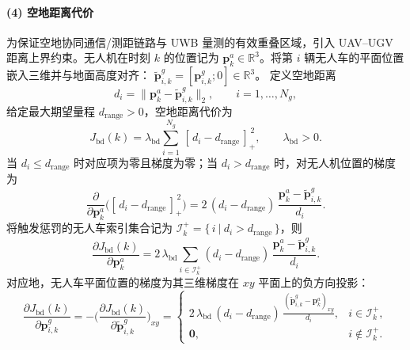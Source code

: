 \paragraph{(4) 空地距离代价}
为保证空地协同通信/测距链路与 UWB 量测的有效重叠区域，引入 UAV--UGV 距离上界约束。无人机在时刻 \(k\) 的位置记为 \(\mathbf{p}^{a}_{k}\in\mathbb{R}^3\)。将第 \(i\) 辆无人车的平面位置嵌入三维并与地面高度对齐：
\(
\tilde{\mathbf{p}}^{g}_{i,k}=[\mathbf{p}^{g}_{i,k};0]\in\mathbb{R}^3
\)。
定义空地距离
\begin{equation}
\label{eq:bdry_dist}
d_i=\big\|\mathbf{p}^{a}_{k}-\tilde{\mathbf{p}}^{g}_{i,k}\big\|_2,\qquad i=1,\dots,N_g,
\end{equation}
给定最大期望量程 \(d_{\mathrm{range}}>0\)，空地距离代价为
\begin{equation}
\label{eq:J_bdry}
J_{\mathrm{bd}}(k)
=\lambda_{\mathrm{bd}}\sum_{i=1}^{N_g}\,[\,d_i-d_{\mathrm{range}}\,]_+^{\,2},
\qquad \lambda_{\mathrm{bd}}>0.
\end{equation}
当 \(d_i\le d_{\mathrm{range}}\) 时对应项为零且梯度为零；当 \(d_i>d_{\mathrm{range}}\) 时，对无人机位置的梯度为
\begin{equation}
\label{eq:J_bdry_grad_a_single}
\frac{\partial}{\partial \mathbf{p}^{a}_{k}}\Big([\,d_i-d_{\mathrm{range}}\,]_+^{\,2}\Big)
=2\,(d_i-d_{\mathrm{range}})\,
\frac{\mathbf{p}^{a}_{k}-\tilde{\mathbf{p}}^{g}_{i,k}}{d_i}.
\end{equation}
将触发惩罚的无人车索引集合记为
\(
\mathcal{I}^{+}_{k}=\{\,i~|~d_i>d_{\mathrm{range}}\,\}
\)，则
\begin{equation}
\label{eq:J_bdry_grad_sum_a}
\frac{\partial J_{\mathrm{bd}}(k)}{\partial \mathbf{p}^{a}_{k}}
=2\,\lambda_{\mathrm{bd}}\sum_{i\in\mathcal{I}^{+}_{k}}
(d_i-d_{\mathrm{range}})\,
\frac{\mathbf{p}^{a}_{k}-\tilde{\mathbf{p}}^{g}_{i,k}}{d_i}.
\end{equation}
对应地，无人车平面位置的梯度为其三维梯度在 \(xy\) 平面上的负方向投影：
\begin{equation}
\label{eq:J_bdry_grad_sum_g}
\frac{\partial J_{\mathrm{bd}}(k)}{\partial \mathbf{p}^{g}_{i,k}}
=-\Big(\frac{\partial J_{\mathrm{bd}}(k)}{\partial \tilde{\mathbf{p}}^{g}_{i,k}}\Big)_{xy}
=
\begin{cases}
\displaystyle
2\,\lambda_{\mathrm{bd}}\,(d_i-d_{\mathrm{range}})\,
\frac{(\tilde{\mathbf{p}}^{g}_{i,k}-\mathbf{p}^{a}_{k})_{xy}}{d_i}, & i\in\mathcal{I}^{+}_{k},\\[10pt]
\mathbf{0}, & i\notin\mathcal{I}^{+}_{k}.
\end{cases}
\end{equation}

